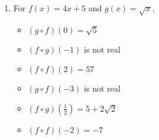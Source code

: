 \begin{enumerate}
\begin{multicols}{3}
\begin{itemize}
\item  $(f \circ f)(2) = 0$

\end{itemize}

\end{multicols}

\begin{multicols}{3}

\begin{itemize}

\item  $(g\circ f)(-3) = 11$

\item  $(f\circ g)\left(\frac{1}{2}\right) = \frac{23}{4}$

\item  $(f \circ f)(-2) = 2$

\end{itemize}

\end{multicols}

\item  For $f(x) = 4x+5$ and $g(x) = \sqrt{x}$,
\begin{multicols}{3}

\begin{itemize}

\item  $(g\circ f)(0) = \sqrt{5}$

\item  $(f\circ g)(-1)$ is not real

\item  $(f \circ f)(2) = 57$

\end{itemize}

\end{multicols}

\begin{multicols}{3}

\begin{itemize}

\item  $(g\circ f)(-3)$ is not real

\item  $(f\circ g)\left(\frac{1}{2}\right) = 5+2\sqrt{2}$

\item  $(f \circ f)(-2) = -7$

\end{itemize}

\end{multicols}


\end{enumerate}
